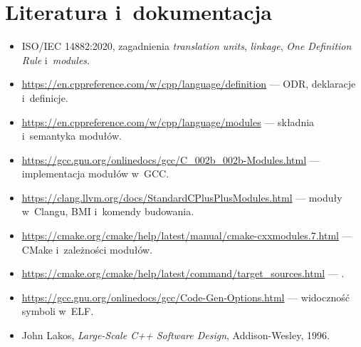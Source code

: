 \section*{Literatura i~dokumentacja}
\begingroup\sloppy
\begin{itemize}
\item ISO/IEC 14882:2020, zagadnienia \emph{translation units},
      \emph{linkage}, \emph{One Definition Rule} i~\emph{modules}.
\item \url{https://en.cppreference.com/w/cpp/language/definition}
      --- ODR, deklaracje i~definicje.
\item \url{https://en.cppreference.com/w/cpp/language/modules}
      --- składnia i~semantyka modułów.
\item \url{https://gcc.gnu.org/onlinedocs/gcc/C_002b_002b-Modules.html}
      --- implementacja modułów w~GCC.
\item \url{https://clang.llvm.org/docs/StandardCPlusPlusModules.html}
      --- moduły w~Clangu, BMI i~komendy budowania.
\item \url{https://cmake.org/cmake/help/latest/manual/cmake-cxxmodules.7.html}
      --- CMake i~zależności modułów.
\item \url{https://cmake.org/cmake/help/latest/command/target_sources.html}
      --- .
\item \url{https://gcc.gnu.org/onlinedocs/gcc/Code-Gen-Options.html}
      --- widoczność symboli w~ELF.
\item John Lakos, \emph{Large-Scale C++ Software Design}, Addison-Wesley, 1996.
\end{itemize}
\endgroup
